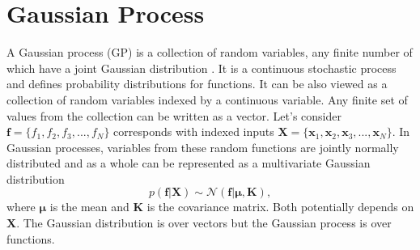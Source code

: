 \section{Gaussian Process}
A Gaussian process (GP) is a collection of random variables, any finite number of which have a joint Gaussian distribution \cite{Rasmussen_and_Williams:2006}. It is a continuous stochastic process and defines probability distributions for functions. It can be also viewed as a collection of random variables indexed by a continuous variable. Any finite set of values from the collection can be written as a vector. Let's consider $ \textbf{f} = \{ f_1, f_2, f_3,..., f_N\}$ corresponds with indexed inputs $ \textbf{X} = \{ \textbf{x}_1, \textbf{x}_2, \textbf{x}_3,..., \textbf{x}_N\}$. In Gaussian processes, variables from these random functions are jointly normally distributed and as a whole can be represented as a multivariate Gaussian distribution
\begin{equation} \label{eq:2.2}
p(\textbf{f}|\textbf{X})\sim \mathcal{N}\left(\textbf{f}|\boldsymbol\mu,\textbf{K}\right),
\end{equation}
where $\boldsymbol\mu$ is the mean and $\textbf{K}$ is the covariance matrix. Both potentially depends on $\textbf{X}$. The Gaussian distribution is over vectors but the Gaussian process is over functions.


